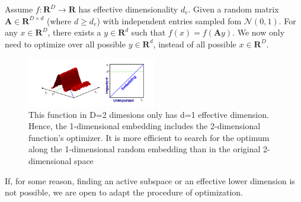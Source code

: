 \begin{enumerate}
Assume $ f : \mathbf{R}^D \rightarrow \mathbf{R} $ has effective dimensionality $d_e$.
Given a random matrix $ \mathbf{A} \in \mathbf{R}^{D \times d} $ (where $d \geq d_e$) with independent entries sampled fom $ \mathcal{N}(0, 1) $.
For any $ x \in \mathbf{R}^D $, there exists a $y \in \mathbf{R}^d $ such that $ f(x) = f(\mathbf{A} y ) $.
We now only need to optimize over all possible $y \in \mathbf{R}^d$, instead of all possible $x \in \mathbf{R}^D $.


\begin{figure}[h]
\centering
\includegraphics[width=0.5\textwidth]{./../src/Embedding_optimization.png}
\caption{ This function in D=2 dimesions only has d=1 effective dimension. Hence, the 1-dimensional embedding includes the 2-dimensional function’s optimizer. It is more efficient to search for the optimum along the 1-dimensional random embedding than in the original 2-dimensional space}
\end{figure}

\end{enumerate}

If, for some reason, finding an active subspace or an effective lower dimension is not possible, we are open to adapt the procedure of optimization.
